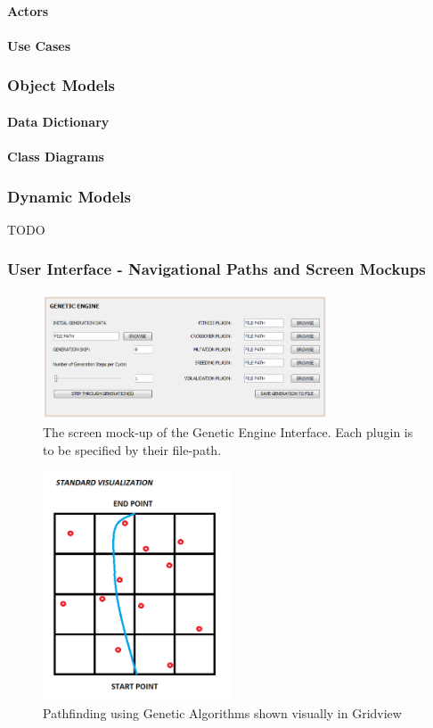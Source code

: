 \paragraph{Actors}
\paragraph{Use Cases}

\subsubsection{Object Models}
\paragraph{Data Dictionary}
\paragraph{Class Diagrams}

\subsubsection{Dynamic Models}
TODO

\subsubsection{User Interface - Navigational Paths and Screen Mockups}
\begin{figure}[h!]
 \caption{The screen mock-up of the Genetic Engine Interface. Each plugin is to be specified by their file-path.}
 \includegraphics[width=0.75\textwidth]{../../screen1.png}
\end{figure}

\begin{figure}[h!]
 \caption{Pathfinding using Genetic Algorithms shown visually in Gridview}
 \includegraphics[width=0.5\textwidth]{../../screen2.png}
\end{figure}

